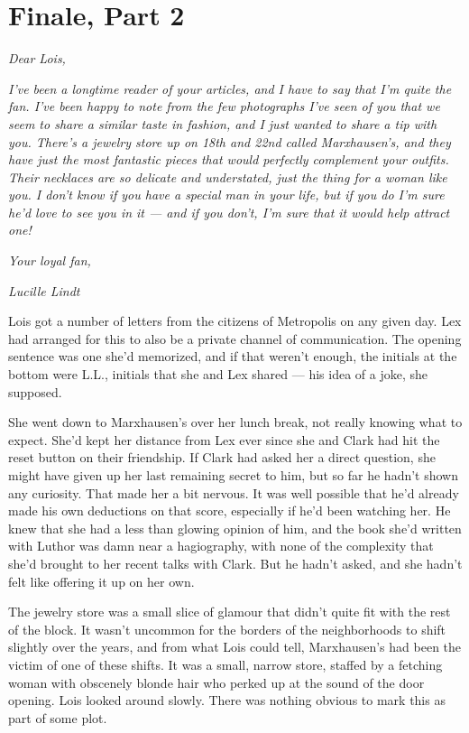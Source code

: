 \hypertarget{finale-part-2}{%
\chapter{Finale, Part 2}\label{finale-part-2}}

\emph{Dear Lois,}

\emph{I've been a longtime reader of your articles, and I have to say
that I'm quite the fan. I've been happy to note from the few photographs
I've seen of you that we seem to share a similar taste in fashion, and I
just wanted to share a tip with you. There's a jewelry store up on 18th
and 22nd called Marxhausen's, and they have just the most fantastic
pieces that would perfectly complement your outfits. Their necklaces are
so delicate and understated, just the thing for a woman like you. I
don't know if you have a special man in your life, but if you do I'm
sure he'd love to see you in it --- and if you don't, I'm sure that it
would help attract one!}

\emph{Your loyal fan,}

\emph{Lucille Lindt}

Lois got a number of letters from the citizens of Metropolis on any
given day. Lex had arranged for this to also be a private channel of
communication. The opening sentence was one she'd memorized, and if that
weren't enough, the initials at the bottom were L.L., initials that she
and Lex shared --- his idea of a joke, she supposed.

She went down to Marxhausen's over her lunch break, not really knowing
what to expect. She'd kept her distance from Lex ever since she and
Clark had hit the reset button on their friendship. If Clark had asked
her a direct question, she might have given up her last remaining secret
to him, but so far he hadn't shown any curiosity. That made her a bit
nervous. It was well possible that he'd already made his own deductions
on that score, especially if he'd been watching her. He knew that she
had a less than glowing opinion of him, and the book she'd written with
Luthor was damn near a hagiography, with none of the complexity that
she'd brought to her recent talks with Clark. But he hadn't asked, and
she hadn't felt like offering it up on her own.

The jewelry store was a small slice of glamour that didn't quite fit
with the rest of the block. It wasn't uncommon for the borders of the
neighborhoods to shift slightly over the years, and from what Lois could
tell, Marxhausen's had been the victim of one of these shifts. It was a
small, narrow store, staffed by a fetching woman with obscenely blonde
hair who perked up at the sound of the door opening. Lois looked around
slowly. There was nothing obvious to mark this as part of some plot.

